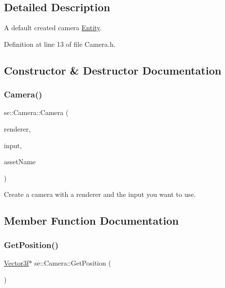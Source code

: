 \subsection{Detailed Description}
A default created camera \mbox{\hyperlink{classse_1_1_entity}{Entity}}. 

Definition at line 13 of file Camera.\+h.



\subsection{Constructor \& Destructor Documentation}
\mbox{\label{classse_1_1_camera_a45cc397abfbd7287d96dbbb70330f2e5}} 
\subsubsection{\texorpdfstring{Camera()}{Camera()}}
{\footnotesize\ttfamily se\+::\+Camera\+::\+Camera (\begin{DoxyParamCaption}\item[{\mbox{\hyperlink{classse_1_1_abstract_renderer}{Abstract\+Renderer}} $\ast$}]{renderer,  }\item[{\mbox{\hyperlink{classse_1_1_abstract_input}{Abstract\+Input}} $\ast$}]{input,  }\item[{const std\+::string \&}]{asset\+Name }\end{DoxyParamCaption})}

Create a camera with a renderer and the input you want to use. 

\subsection{Member Function Documentation}
\mbox{\label{classse_1_1_camera_a9d163903ddf8f4c5fa8cee70dbfec689}} 
\subsubsection{\texorpdfstring{Get\+Position()}{GetPosition()}}
{\footnotesize\ttfamily \mbox{\hyperlink{namespacese_a12e07512d95e2fdebdaf74a5ea2cf5f6}{Vector3f}}$\ast$ se\+::\+Camera\+::\+Get\+Position (\begin{DoxyParamCaption}{ }\end{DoxyParamCaption})}

